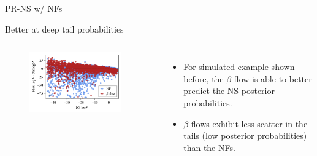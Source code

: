\documentclass[aspectratio=169, 11pt]{beamer}
\begin{document}
\begin{frame}{PR-NS w/ NFs}
    \centering
    \vfill
    \vfill
\end{frame}

\begin{frame}{Better at deep tail probabilities}
    \begin{columns}
        \vspace{3em}
        \begin{figure}
            \centering
            \includegraphics[width=0.9\textwidth]{Ca_Foscari Beamer/NF_vs_betaflow_simulated_v2.pdf}
        \end{figure}
    \begin{itemize}
        \item For simulated example shown before, the $\beta$-flow is able to better predict the NS posterior probabilities.
        \item $\beta$-flows exhibit less scatter in the tails (low posterior probabilities) than the NFs.
    \end{itemize}
    \end{columns}
\end{frame}
\end{document}
